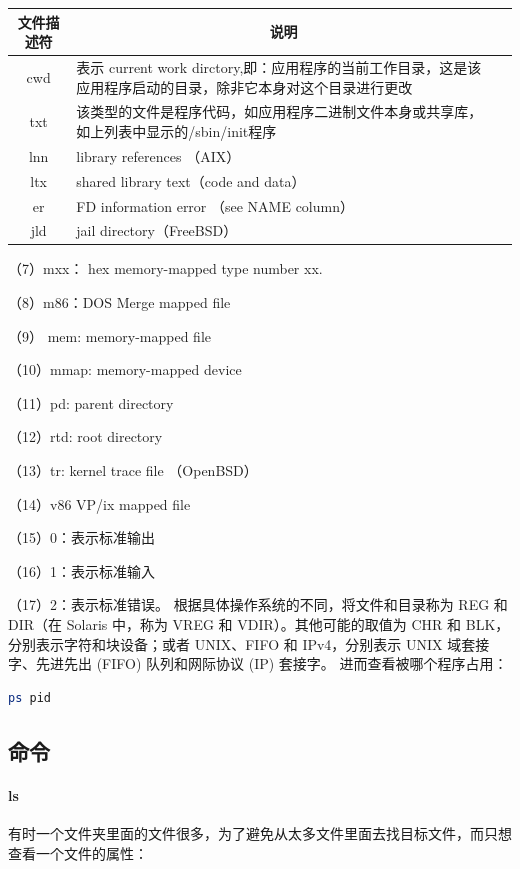 \documentclass[letter]{book}
\begin{document}
\begin{tabular}{cp{8cm}c}
	\hline
	\multirow{1}{*}{文件描述符}
	& \multicolumn{1}{c}{说明}  \\
	\hline			
	cwd & 表示 current  work dirctory,即：应用程序的当前工作目录，这是该应用程序启动的目录，除非它本身对这个目录进行更改 \\
	txt & 该类型的文件是程序代码，如应用程序二进制文件本身或共享库，如上列表中显示的/sbin/init程序 \\
	lnn & library references （AIX） \\
	ltx & shared  library text（code and  data） \\
	er & FD  information  error （see  NAME  column） \\
	jld & jail  directory（FreeBSD） \\	
	\hline
\end{tabular}

（7）mxx： hex  memory-mapped  type number  xx.

（8）m86：DOS  Merge  mapped  file

（9） mem: memory-mapped  file 

（10）mmap: memory-mapped device

（11）pd: parent  directory

（12）rtd: root  directory

（13）tr: kernel  trace file （OpenBSD）

（14）v86  VP/ix  mapped  file

（15）0：表示标准输出

（16）1：表示标准输入

（17）2：表示标准错误。
根据具体操作系统的不同，将文件和目录称为 REG 和 DIR（在 Solaris 中，称为 VREG 和 VDIR）。其他可能的取值为 CHR 和 BLK，分别表示字符和块设备；或者 UNIX、FIFO 和 IPv4，分别表示 UNIX 域套接字、先进先出 (FIFO) 队列和网际协议 (IP) 套接字。
进而查看被哪个程序占用：

\begin{lstlisting}[language=Bash]
ps pid
\end{lstlisting}

\subsection{命令}

\paragraph{ls}

有时一个文件夹里面的文件很多，为了避免从太多文件里面去找目标文件，而只想查看一个文件的属性：
\end{document}
